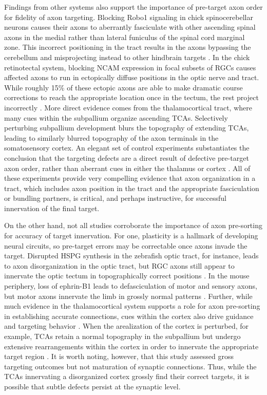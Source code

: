 Findings from other systems also support the importance of pre-target axon order for fidelity of axon targeting.
Blocking Robo1 signaling in chick spinocerebellar neurons causes their axons to aberrantly fasciculate with other ascending spinal axons in the medial rather than lateral funiculus of the spinal cord marginal zone.
This incorrect positioning in the tract results in the axons bypassing the cerebellum and misprojecting instead to other hindbrain targets \cite{sakai2012axon}.
In the chick retinotectal system, blocking NCAM expression in focal subsets of RGCs causes affected axons to run in ectopically diffuse positions in the optic nerve and tract.
While roughly 15\% of these ectopic axons are able to make dramatic course corrections to reach the appropriate location once in the tectum, the rest project incorrectly \cite{thanos1984fiber}.
More direct evidence comes from the thalamocortical tract, where many cues within the subpallium organize ascending TCAs.
Selectively perturbing subpallium development blurs the topography of extending TCAs, leading to similarly blurred topography of the axon terminals in the somatosensory cortex.
An elegant set of control experiments substantiates the conclusion that the targeting defects are a direct result of defective pre-target axon order, rather than aberrant cues in either the thalamus or cortex \cite{lokmane2013sensory}.
All of these experiments provide very compelling evidence that axon organization in a tract, which includes axon position in the tract and the appropriate fasciculation or bundling partners, is critical, and perhaps instructive, for successful innervation of the final target.

On the other hand, not all studies corroborate the importance of axon pre-sorting for accuracy of target innervation.
For one, plasticity is a hallmark of developing neural circuits, so pre-target errors may be correctable once axons invade the target.
Disrupted HSPG synthesis in the zebrafish optic tract, for instance, leads to axon disorganization in the optic tract, but RGC axons still appear to innervate the optic tectum in topographically correct positions \cite{lee2004axon}.
In the mouse periphery, loss of ephrin-B1 leads to defasciculation of motor and sensory axons, but motor axons innervate the limb in grossly normal patterns \cite{luxey2013eph}.
Further, while much evidence in the thalamocortical system supports a role for axon pre-sorting in establishing accurate connections, cues within the cortex also drive guidance and targeting behavior \cite[reviewed in][]{garel2014inputs}.
When the arealization of the cortex is perturbed, for example, TCAs retain a normal topography in the subpallium but undergo extensive rearrangements within the cortex in order to innervate the appropriate target region \cite{shimogori2005fibroblast}.
It is worth noting, however, that this study assessed gross targeting outcomes but not maturation of synaptic connections.
Thus, while the TCAs innervating a disorganized cortex grossly find their correct targets, it is possible that subtle defects persist at the synaptic level.

